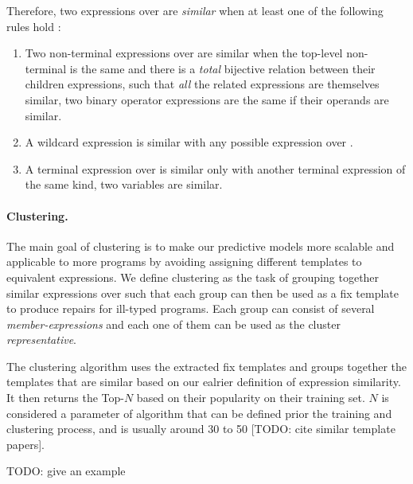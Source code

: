 Therefore, two expressions over \repairLang are \emph{similar} when at least one
of the following rules hold :
\begin{enumerate}
    \item Two non-terminal expressions over \repairLang are similar when the
    top-level non-terminal is the same and there is a \emph{total} bijective
    relation between their children expressions, such that \emph{all} the
    related expressions are themselves similar, \eg two binary operator
    expressions are the same if their operands are similar.
    \item A wildcard expression is similar with any possible expression over
    \repairLang.
    \item A terminal expression over \repairLang is similar only with another
    terminal expression of the same kind, \eg two variables are similar.
\end{enumerate}

\paragraph{Clustering.}
The main goal of clustering is to make our predictive models more scalable
and applicable to more programs by avoiding assigning different templates
to equivalent expressions. We define
clustering as the task of grouping together similar expressions over \repairLang
such that each group can then be used as a fix template to produce repairs for
ill-typed programs. Each group can consist of several \emph{member-expressions}
and each one of them can be used as the cluster \emph{representative}.

The clustering algorithm uses the extracted fix templates and groups together
the templates that are similar based on our ealrier definition of expression
similarity. It then returns the Top-$N$ based on their popularity on their
training set. $N$ is considered a parameter of algorithm that can be defined
prior the training and clustering process, and is usually around 30 to 50 [TODO:
cite similar template papers].

TODO: give an example
